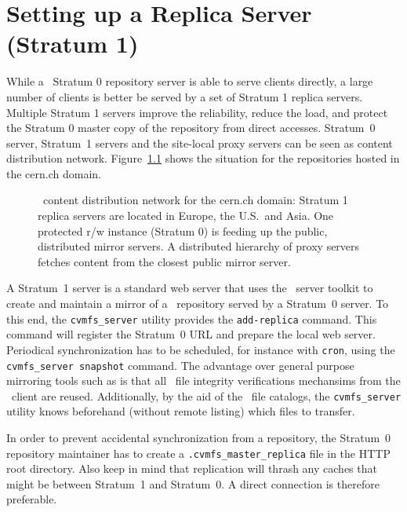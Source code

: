 \chapter{Setting up a Replica Server (Stratum 1)}
\label{sct:replica}

While a \cvmfs\ Stratum 0 repository server is able to serve clients directly, a large number of clients is better be served by a set of Stratum 1 replica servers.
Multiple Stratum 1 servers improve the reliability, reduce the load, and protect the Stratum 0 master copy of the repository from direct accesses.
Stratum~0 server, Stratum~1 servers and the site-local proxy servers can be seen as content distribution network.
Figure~\ref{fig:stratum1} shows the situation for the repositories hosted in the cern.ch domain.

\begin{figure}
	\begin{center}
		\resizebox{\textwidth}{!}{}
	\end{center}
	\caption{\cvmfs\ content distribution network for the cern.ch domain: Stratum 1 replica servers are located in Europe, the U.S.\ and Asia.  
		One protected r/w instance (Stratum 0) is feeding up the public, distributed mirror servers. 
		A distributed hierarchy of proxy servers fetches content from the closest public mirror server.}
	\label{fig:stratum1}
\end{figure}

A Stratum~1 server is a standard web server that uses the \cvmfs\ server toolkit to create and maintain a mirror of a \cvmfs\ repository served by a Stratum~0 server.
To this end, the \texttt{cvmfs\_server} utility provides the \texttt{add-replica} command.
This command will register the Stratum~0 URL and prepare the local web server.
Periodical synchronization has to be scheduled, for instance with \texttt{cron}, using the \texttt{cvmfs\_server snapshot} command.
The advantage over general purpose mirroring tools such as  is that all \cvmfs\ file integrity verifications mechansims from the \fuse\ client are reused.
Additionally, by the aid of the \cvmfs\ file catalogs, the \texttt{cvmfs\_server} utility knows beforehand (without remote listing) which files to transfer.

In order to prevent accidental synchronization from a repository, the Stratum~0 repository maintainer has to create a \texttt{.cvmfs\_master\_replica} file in the HTTP root directory.
Also keep in mind that replication will thrash any caches that might be between Stratum~1 and Stratum~0.
A direct connection is therefore preferable.

